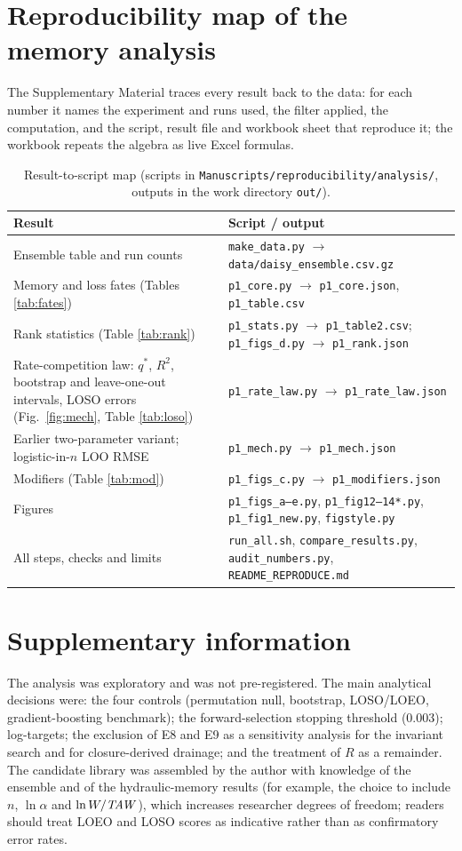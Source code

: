 \section{Reproducibility map of the memory analysis}\label{app:repro}
The Supplementary Material traces every result back to the data: for each number it names the experiment and runs used, the filter applied, the computation, and the script, result file and workbook sheet that reproduce it; the workbook repeats the algebra as live Excel formulas.
\begin{table}[H]\centering\footnotesize
\caption{Result-to-script map (scripts in \texttt{Manuscripts/reproducibility/analysis/}, outputs in the work directory \texttt{out/}).}
\begin{tabularx}{\textwidth}{XX}
\toprule
Result & Script / output\\\midrule
Ensemble table and run counts & \texttt{make\_data.py} $\to$ \texttt{data/daisy\_ensemble.csv.gz}\\
Memory and loss fates (Tables \ref{tab:fates}) & \texttt{p1\_core.py} $\to$ \texttt{p1\_core.json}, \texttt{p1\_table.csv}\\
Rank statistics (Table \ref{tab:rank}) & \texttt{p1\_stats.py} $\to$ \texttt{p1\_table2.csv}; \texttt{p1\_figs\_d.py} $\to$ \texttt{p1\_rank.json}\\
Rate-competition law: $q^\ast$, $R^2$, bootstrap and leave-one-out intervals, LOSO errors (Fig.\ \ref{fig:mech}, Table \ref{tab:loso}) & \texttt{p1\_rate\_law.py} $\to$ \texttt{p1\_rate\_law.json}\\
Earlier two-parameter variant; logistic-in-$n$ LOO RMSE & \texttt{p1\_mech.py} $\to$ \texttt{p1\_mech.json}\\
Modifiers (Table \ref{tab:mod}) & \texttt{p1\_figs\_c.py} $\to$ \texttt{p1\_modifiers.json}\\
Figures & \texttt{p1\_figs\_a--e.py}, \texttt{p1\_fig12--14*.py}, \texttt{p1\_fig1\_new.py}, \texttt{figstyle.py}\\
All steps, checks and limits & \texttt{run\_all.sh}, \texttt{compare\_results.py}, \texttt{audit\_numbers.py}, \texttt{README\_REPRODUCE.md}\\\bottomrule
\end{tabularx}
\end{table}

\section{Supplementary information}
The analysis was exploratory and was not pre-registered. The main analytical decisions were: the four controls (permutation null, bootstrap, LOSO/LOEO, gradient-boosting benchmark); the forward-selection stopping threshold (0.003); log-targets; the exclusion of E8 and E9 as a sensitivity analysis for the invariant search and for closure-derived drainage; and the treatment of $R$ as a remainder. The candidate library was assembled by the author with knowledge of the ensemble and of the hydraulic-memory results (for example, the choice to include $n$, $\ln\alpha$ and $\ln W/\mathit{TAW}$), which increases researcher degrees of freedom; readers should treat LOEO and LOSO scores as indicative rather than as confirmatory error rates.

